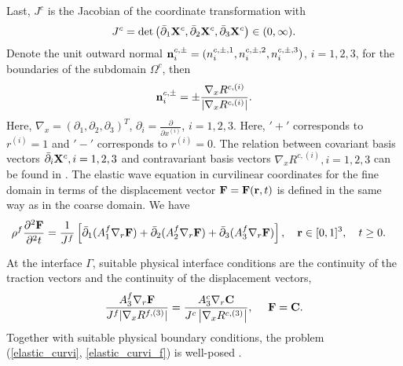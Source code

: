 Last, $J^c$ is the Jacobian of the coordinate transformation with
\[J^c = \mbox{det} \left(\bar{\partial}_1 {\bf X}^c, \bar{\partial}_2 {\bf X}^c, \bar{\partial}_3 {\bf X}^c\right)\in (0,\infty).\] 
Denote the unit outward normal ${\bf n}_i^{c,\pm} = (n_i^{c,\pm,1},n_i^{c,\pm,2},n_i^{c,\pm,3})$, $i = 1,2,3$, for the boundaries of the subdomain $\Omega^c$, then
\begin{align}\label{outward_normal}
{\bf n}_i^{c,\pm}  = \pm \frac{\nabla_x R^{c,(i)}}{|\nabla_x R^{c,(i)}|}.
\end{align}
Here, $\nabla_x = (\partial_1, \partial_2, \partial_3)^T$, $\partial_i = \frac{\partial}{\partial
  x^{(i)}}$, $i = 1,2,3$. Here, $'+'$ corresponds to $r^{(i)} = 1$ and $'-'$ corresponds to $r^{(i)}
= 0$. The relation between covariant basis vectors $\bar{\partial}_i {\bf X}^c, i = 1,2,3$ and
contravariant basis vectors $\nabla_x R^{c,(i)}, i = 1,2,3$ can be found in \cite{petersson2015wave,
  thompson1985numerical}. The elastic wave equation in curvilinear coordinates for the fine domain
in terms of the displacement vector ${\bf F} = {\bf F}({\bf r}, t)$ is defined in the same way as in
the coarse domain. We have
\begin{align}\label{elastic_curvi_f}
	\rho^f\frac{\partial^2{\bf F}}{\partial^2 t} &= \frac{1}{J^f}\left[\bar{\partial}_1(A_1^f\nabla_r{\bf F}) + \bar{\partial}_2(A_2^f\nabla_r{\bf F}) + \bar{\partial}_3(A_3^f\nabla_r{\bf F}) \right], \ \ \  {\bf r}\in [0,1]^3,\ \ \  t\geq0.
\end{align}

At the interface $\Gamma$, suitable physical interface conditions are the continuity of the traction vectors and the continuity of the displacement vectors,
\begin{equation}\label{interface_cond}
\frac{A_3^f\nabla_r{\bf F}}{J^f|\nabla_x R^{f,(3)}|}  = \frac{A_3^c\nabla_r{\bf C}}{J^c\left|\nabla_x R^{c,(3)}\right|}, \ \ \ \ {\bf F} = {\bf C}.
\end{equation}
Together with suitable physical boundary conditions, the problem (\ref{elastic_curvi}, \ref{elastic_curvi_f}) is well-posed \cite{duru2014stable, petersson2015wave}.


